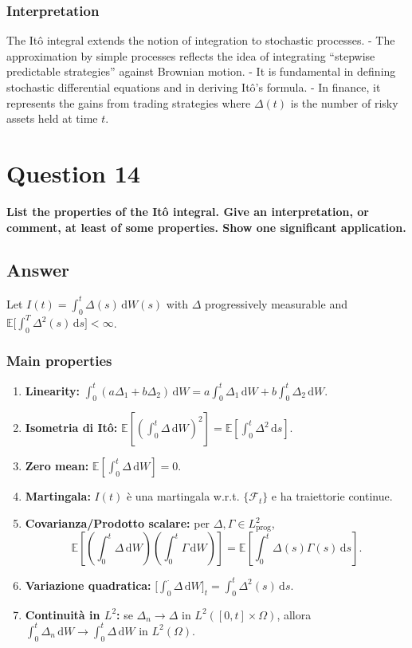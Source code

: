 \documentclass[12pt,a4paper]{book}
\theoremstyle{remark}
\newcommand{\EE}{\mathbb{E}}          %
\newcommand{\F}{\mathcal{F}}          %
\newcommand{\dd}{\mathrm{d}}
\begin{document}
\subsubsection*{Interpretation}
The Itô integral extends the notion of integration to stochastic processes.  
- The approximation by simple processes reflects the idea of integrating “stepwise predictable strategies” against Brownian motion.  
- It is fundamental in defining stochastic differential equations and in deriving Itô’s formula.  
- In finance, it represents the gains from trading strategies where $\Delta(t)$ is the number of risky assets held at time $t$.







\newpage
\section{Question 14}
\textbf{List the properties of the It\^o integral. Give an interpretation, or comment, at least of some properties. Show one significant application.}

\subsection*{Answer}

Let $I(t)=\int_0^t \Delta(s)\,\dd W(s)$ with $\Delta$ progressively measurable and $\EE\!\big[\int_0^T \Delta^2(s)\,\dd s\big]<\infty$.

\subsubsection*{Main properties}
\begin{enumerate}[label=\roman*)]
\item \textbf{Linearity:} $\displaystyle \int_0^t (a\Delta_1+b\Delta_2)\,\dd W = a\int_0^t \Delta_1\,\dd W + b\int_0^t \Delta_2\,\dd W.$
\item \textbf{Isometria di It\^o:} $\displaystyle \EE\!\left[\left(\int_0^t \Delta\,\dd W\right)^2\right]=\EE\!\left[\int_0^t \Delta^2\,\dd s\right].$
\item \textbf{Zero mean:} $\displaystyle \EE\!\left[\int_0^t \Delta\,\dd W\right]=0.$
\item \textbf{Martingala:} $I(t)$ è una martingala w.r.t. $\{\F_t\}$ e ha traiettorie continue.
\item \textbf{Covarianza/Prodotto scalare:} per $\Delta,\Gamma\in L^2_{\text{prog}}$,
\[
\EE\!\left[\left(\int_0^t \Delta\,\dd W\right)\!\left(\int_0^t \Gamma\,\dd W\right)\right]
=\EE\!\left[\int_0^t \Delta(s)\Gamma(s)\,\dd s\right].
\]
\item \textbf{Variazione quadratica:} $\displaystyle \big[\textstyle\int_0^\cdot \Delta\,\dd W\big]_t=\int_0^t \Delta^2(s)\,\dd s.$
\item \textbf{Continuit\`a in $L^2$:} se $\Delta_n\to\Delta$ in $L^2([0,t]\times\Omega)$, allora $\int_0^t \Delta_n\,\dd W \to \int_0^t \Delta\,\dd W$ in $L^2(\Omega)$.
\end{enumerate}
\end{document}
